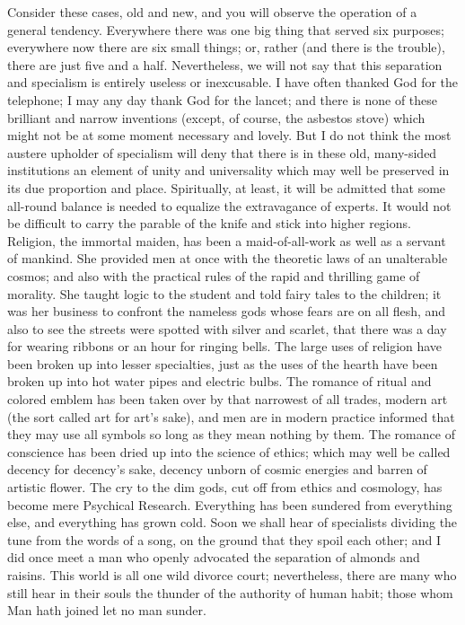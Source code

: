 \documentclass{book}
\begin{document}
Consider these cases, old and new, and you will observe the operation of a general tendency. Everywhere there was one big thing that served six purposes; everywhere now there are six small things; or, rather (and there is the trouble), there are just five and a half. Nevertheless, we will not say that this separation and specialism is entirely useless or inexcusable. I have often thanked God for the telephone; I may any day thank God for the lancet; and there is none of these brilliant and narrow inventions (except, of course, the asbestos stove) which might not be at some moment necessary and lovely. But I do not think the most austere upholder of specialism will deny that there is in these old, many-sided institutions an element of unity and universality which may well be preserved in its due proportion and place. Spiritually, at least, it will be admitted that some all-round balance is needed to equalize the extravagance of experts. It would not be difficult to carry the parable of the knife and stick into higher regions. Religion, the immortal maiden, has been a maid-of-all-work as well as a servant of mankind. She provided men at once with the theoretic laws of an unalterable cosmos; and also with the practical rules of the rapid and thrilling game of morality. She taught logic to the student and told fairy tales to the children; it was her business to confront the nameless gods whose fears are on all flesh, and also to see the streets were spotted with silver and scarlet, that there was a day for wearing ribbons or an hour for ringing bells. The large uses of religion have been broken up into lesser specialties, just as the uses of the hearth have been broken up into hot water pipes and electric bulbs. The romance of ritual and colored emblem has been taken over by that narrowest of all trades, modern art (the sort called art for art’s sake), and men are in modern practice informed that they may use all symbols so long as they mean nothing by them. The romance of conscience has been dried up into the science of ethics; which may well be called decency for decency’s sake, decency unborn of cosmic energies and barren of artistic flower. The cry to the dim gods, cut off from ethics and cosmology, has become mere Psychical Research. Everything has been sundered from everything else, and everything has grown cold. Soon we shall hear of specialists dividing the tune from the words of a song, on the ground that they spoil each other; and I did once meet a man who openly advocated the separation of almonds and raisins. This world is all one wild divorce court; nevertheless, there are many who still hear in their souls the thunder of the authority of human habit; those whom Man hath joined let no man sunder.
\end{document}
